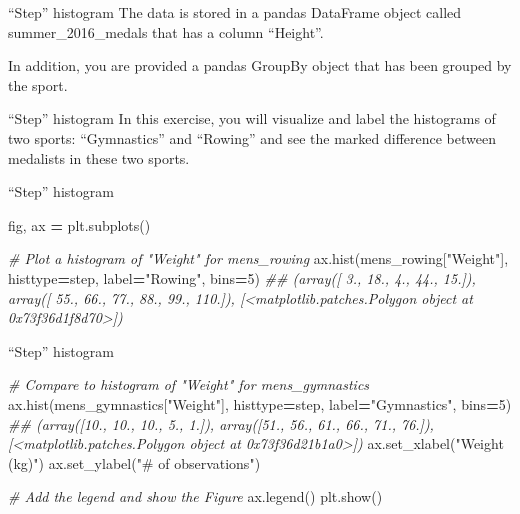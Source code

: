 \documentclass[
  ignorenonframetext,
]{beamer}
\newenvironment{Shaded}{\begin{snugshade}}{\end{snugshade}}
\newcommand{\CommentTok}[1]{\textcolor[rgb]{0.56,0.35,0.01}{\textit{#1}}}
\newcommand{\DecValTok}[1]{\textcolor[rgb]{0.00,0.00,0.81}{#1}}
\newcommand{\NormalTok}[1]{#1}
\newcommand{\OperatorTok}[1]{\textcolor[rgb]{0.81,0.36,0.00}{\textbf{#1}}}
\newcommand{\StringTok}[1]{\textcolor[rgb]{0.31,0.60,0.02}{#1}}
\begin{document}
\begin{frame}{``Step'' histogram}
\label{step-histogram-1}
The data is stored in a pandas DataFrame object called
summer\_2016\_medals that has a column ``Height''.

In addition, you are provided a pandas GroupBy object that has been
grouped by the sport.
\end{frame}

\begin{frame}{``Step'' histogram}
\label{step-histogram-2}
In this exercise, you will visualize and label the histograms of two
sports: ``Gymnastics'' and ``Rowing'' and see the marked difference
between medalists in these two sports.
\end{frame}

\begin{frame}[fragile]{``Step'' histogram}
\label{step-histogram-3}

\begin{Shaded}
\begin{Highlighting}[]
\NormalTok{fig, ax }\OperatorTok{=}\NormalTok{ plt.subplots()}

\CommentTok{\# Plot a histogram of "Weight" for mens\_rowing}
\NormalTok{ax.hist(mens\_rowing[}\StringTok{"Weight"}\NormalTok{], histtype}\OperatorTok{=}\StringTok{\textquotesingle{}step\textquotesingle{}}\NormalTok{, label}\OperatorTok{=}\StringTok{"Rowing"}\NormalTok{, bins}\OperatorTok{=}\DecValTok{5}\NormalTok{)}
\CommentTok{\#\# (array([ 3., 18.,  4., 44., 15.]), array([ 55.,  66.,  77.,  88.,  99., 110.]), [\textless{}matplotlib.patches.Polygon object at 0x73f36d1f8d70\textgreater{}])}
\end{Highlighting}
\end{Shaded}
\end{frame}

\begin{frame}[fragile]{``Step'' histogram}
\label{step-histogram-4}

\begin{Shaded}
\begin{Highlighting}[]
\CommentTok{\# Compare to histogram of "Weight" for mens\_gymnastics}
\NormalTok{ax.hist(mens\_gymnastics[}\StringTok{"Weight"}\NormalTok{], histtype}\OperatorTok{=}\StringTok{\textquotesingle{}step\textquotesingle{}}\NormalTok{, label}\OperatorTok{=}\StringTok{"Gymnastics"}\NormalTok{, bins}\OperatorTok{=}\DecValTok{5}\NormalTok{)}
\CommentTok{\#\# (array([10., 10., 10.,  5.,  1.]), array([51., 56., 61., 66., 71., 76.]), [\textless{}matplotlib.patches.Polygon object at 0x73f36d21b1a0\textgreater{}])}
\NormalTok{ax.set\_xlabel(}\StringTok{"Weight (kg)"}\NormalTok{)}
\NormalTok{ax.set\_ylabel(}\StringTok{"\# of observations"}\NormalTok{)}

\CommentTok{\# Add the legend and show the Figure}
\NormalTok{ax.legend()}
\NormalTok{plt.show()}
\end{Highlighting}
\end{Shaded}
\end{frame}
\end{document}

